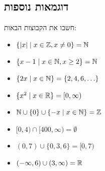 \subsection{דוגמאות נוספות}
חשבו את הקבוצות הבאות:
\begin{itemize}
    \item $\{|x| \mid x \in \mathbb{Z}, x \neq 0\} = \mathbb{N}$
    \item $\{x - 1 \mid x \in \mathbb{N}, x \ge 2\} = \mathbb{N}$
    \item $\{2x \mid x \in \mathbb{N}\} = \{2, 4, 6, \ldots\}$
    \item $\{x^2 \mid x \in \mathbb{R}\} = [0, \infty)$
    \item $\mathbb{N} \cup \{0\} \cup \{-x \mid x \in \mathbb{N}\} = \mathbb{Z}$
    \item $[0, 4) \cap [400, \infty) = \emptyset$
    \item $(0, 7) \cup \{0, 3, 6\} = [0, 7)$
    \item $(-\infty, 6) \cup (3, \infty) = \mathbb{R}$
\end{itemize}

